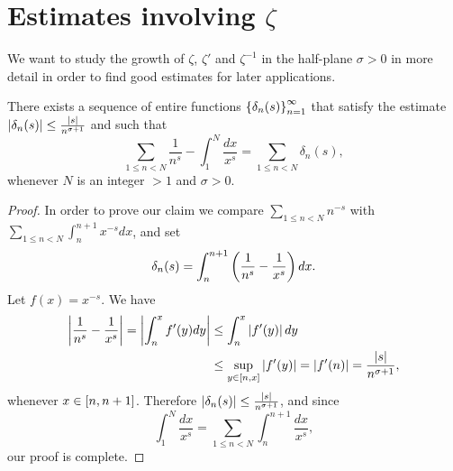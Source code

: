 \section{Estimates involving $\zeta$}
We want to study the growth of $\zeta$, $\zeta'$ and $\zeta^{-1}$ in the half-plane $\sigma > 0$ in more detail in order to find good estimates for later applications.

\begin{proposition}
	There exists a sequence of entire functions $\left\{\delta_n(s)\right\} _{n = 1} ^\infty$ that satisfy the estimate $\left|\delta_n(s)\right| \leq \frac{\left|s\right|}{n^{\sigma + 1}}$ and such that
\begin{equation}\label{equ:SumDelta}
	\sum _{1 \leq n < N} \frac{1}{n^s} - \int _1 ^N \frac{dx}{x^s} = \sum _{1 \leq n < N} \delta_n(s),
\end{equation}
	whenever $N$ is an integer $> 1$ and $\sigma > 0$.
\end{proposition}
\begin{proof}
	In order to prove our claim we compare $\sum _{1 \leq n < N} n^{-s}$ with $\sum _{1 \leq n < N} \int _n ^{n + 1} x^{-s} dx$, and set
\begin{equation}\label{equ:DeltaN}
	\delta_n(s) = \int _n ^{n + 1} \left(\frac{1}{n^s} - \frac{1}{x^s}\right) dx.
\end{equation}
	Let $f(x) = x^{-s}$. We have
\begin{equation*}
\begin{aligned}	
	\left|\frac{1}{n^s} - \frac{1}{x^s}\right| = \left|\int _n ^x f'(y) dy\right| 
	&\leq \int _n ^x \left|f'(y)\right| dy \\
	&\leq \sup _{y \in \left[n, x\right]} \left|f'(y)\right| = \left|f'(n)\right| = \frac{\left|s\right|}{n^{\sigma + 1}},
\end{aligned}
\end{equation*}
	whenever $x \in \left[n, n + 1\right]$. Therefore $\left|\delta_n(s)\right| \leq \frac{\left|s\right|}{n^{\sigma + 1}}$, and since
\begin{equation*}
	\int _1 ^N \frac{dx}{x^s} = \sum _{1 \leq n < N} \int _n ^{n + 1} \frac{dx}{x^s},
\end{equation*}
	our proof is complete.
\end{proof}



